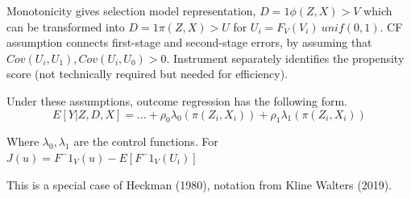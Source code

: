 Monotonicity gives selection model representation, $D = 1{ \phi(Z, X) > V }$ which can be transformed into $D = 1{ \pi(Z, X) > U }$ for $U_i = F_V(V_i) ~ unif(0, 1)$.
CF assumption connects first-stage and second-stage errors, by assuming that $Cov(U_i, U_1),Cov(U_i, U_0)  > 0$.
Instrument separately identifies the propensity score (not technically required but needed for efficiency).

Under these assumptions, outcome regression has the following form.
\[E[Y | Z, D, X] = … + \rho_0 \lambda_0( \pi(Z_i, X_i)) + \rho_1 \lambda_1( \pi(Z_i, X_i)) \]

Where $\lambda_0, \lambda_1$ are the control functions.
For $J(u) = F^-1_V(u) - E[ F^-1_V(U_i) ]$

This is a special case of Heckman (1980), notation from Kline Walters (2019).

